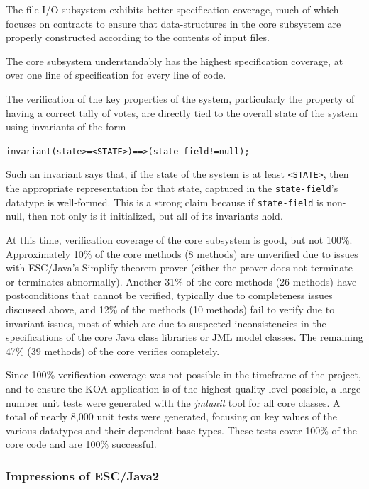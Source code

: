 \documentclass{llncs}
\begin{document}
The file I/O subsystem exhibits better specification coverage, much of
which focuses on contracts to ensure that data-structures in the core
subsystem are properly constructed according to the contents of input
files.

The core subsystem understandably has the highest specification
coverage, at over one line of specification for every line of code.

The verification of the key properties of the system, particularly the
property of having a correct tally of votes, are directly tied to the
overall state of the system using invariants of the form
\begin{alltt}
     invariant (state >= <STATE>) ==> (state-field != null);
\end{alltt}
Such an invariant says that, if the state of the system is at least
\texttt{<STATE>}, then the appropriate representation for that state,
captured in the \texttt{state-field}'s datatype is well-formed.  This
is a strong claim because if \texttt{state-field} is non-null, then
not only is it initialized, but all of its invariants hold.

At this time, verification coverage of the core subsystem is good, but
not 100\%.  Approximately 10\% of the core methods (8 methods) are
unverified due to issues with ESC/Java's Simplify theorem prover
(either the prover does not terminate or terminates abnormally).
Another 31\% of the core methods (26 methods) have postconditions that
cannot be verified, typically due to completeness issues discussed
above, and 12\% of the methods (10 methods) fail to verify due to
invariant issues, most of which are due to suspected inconsistencies
in the specifications of the core Java class libraries or JML model
classes.  The remaining 47\% (39 methods) of the core verifies
completely.

Since 100\% verification coverage was not possible in the timeframe of
the project, and to ensure the KOA application is of the highest
quality level possible, a large number unit tests were generated with
the \emph{jmlunit} tool for all core classes.  A total of nearly 8,000
unit tests were generated, focusing on key values of the various
datatypes and their dependent base types.  These tests cover 100\% of
the core code and are 100\% successful.

\subsubsection{Impressions of ESC/Java2}
\end{document}
